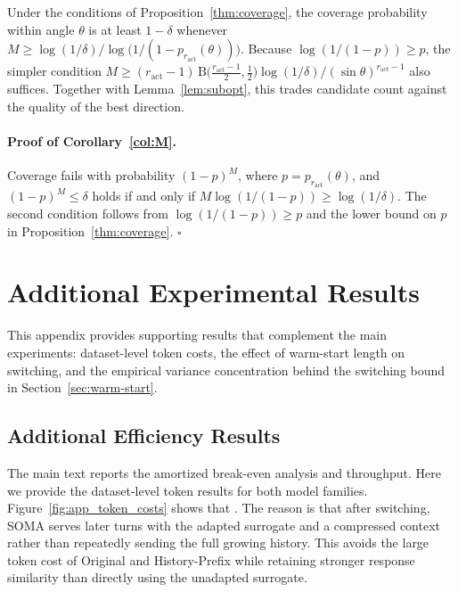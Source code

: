 {\bigskip
\begin{corollary}\label{col:M}
Under the conditions of Proposition~\ref{thm:coverage}, the coverage probability within angle $\theta$ is at least $1-\delta$ whenever $M\ge\log(1/\delta)\big/\log\big(1/(1-p_{r_{\mathrm{act}}}(\theta))\big)$. Because $\log(1/(1-p))\ge p$, the simpler condition $M\ge(r_{\mathrm{act}}-1)\,\mathrm B\big(\frac{r_{\mathrm{act}}-1}{2},\frac12\big)\log(1/\delta)/(\sin\theta)^{r_{\mathrm{act}}-1}$ also suffices. Together with Lemma~\ref{lem:subopt}, this trades candidate count against the quality of the best direction.
\end{corollary}

\paragraph{Proof of Corollary~\ref{col:M}.}
Coverage fails with probability $(1-p)^M$, where $p=p_{r_{\mathrm{act}}}(\theta)$, and $(1-p)^M\le\delta$ holds if and only if $M\log(1/(1-p))\ge\log(1/\delta)$. The second condition follows from $\log(1/(1-p))\ge p$ and the lower bound on $p$ in Proposition~\ref{thm:coverage}.
\hfill$\square$}


\section{Additional Experimental Results}
\label{sec:app_exp}

This appendix provides supporting results that complement the main experiments: dataset-level token costs, the effect of warm-start length on switching, and the empirical variance concentration behind the switching bound in Section~\ref{sec:warm-start}.

\subsection{Additional Efficiency Results}
\label{sec:app_eff}

The main text reports the amortized break-even analysis and throughput. Here we provide the dataset-level token results for both model families. Figure~\ref{fig:app_token_costs} shows that . The reason is that after switching, SOMA serves later turns with the adapted surrogate and a compressed context rather than repeatedly sending the full growing history. This avoids the large token cost of Original and History-Prefix while retaining stronger response similarity than directly using the unadapted surrogate.

